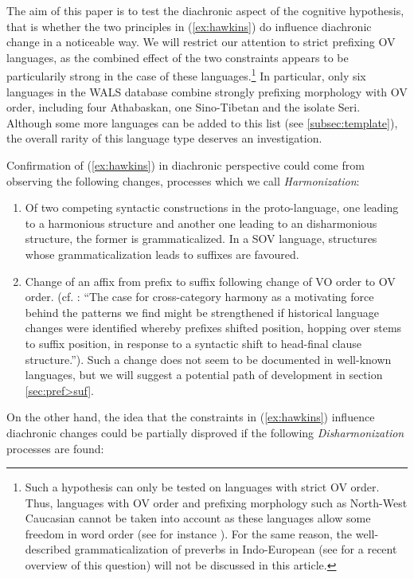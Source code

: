 \documentclass[oldfontcommands,twoside,a4paper,12pt]{article}
\begin{document}
 
 The aim of this paper is to test the diachronic aspect of the cognitive hypothesis, that is whether the two principles in (\ref{ex:hawkins}) do influence diachronic change in a noticeable way. We will restrict our attention to strict prefixing OV languages, as the combined effect of the two constraints appears to be particularily strong in the case of these languages.\footnote{Such a hypothesis can only be tested on languages with strict OV order. Thus, languages with OV order and prefixing morphology such as North-West Caucasian cannot be taken into account as these languages allow some freedom in word order (see for instance \citealt[301]{korotkova10polysynthesis}). For the same reason, the well-described grammaticalization of preverbs in Indo-European (see   \citet{hewson06adposition} for a recent overview of this question) will not be discussed in this article.}  In particular, only six languages in the WALS database combine strongly prefixing morphology with OV order, including four Athabaskan, one Sino-Tibetan and the isolate Seri. Although some more languages can be added to this list (see \ref{subsec:template}), the overall rarity of this language type deserves an investigation. 
 
 
 
Confirmation of (\ref{ex:hawkins}) in diachronic perspective could come from observing the following changes, processes which we call \textit{Harmonization}:
\begin{enumerate}
\item Of two competing syntactic constructions in the proto-language, one leading to a harmonious structure and another one leading to an disharmonious structure, the former is grammaticalized. In a SOV language, structures whose grammaticalization leads to suffixes are favoured.
\item Change of an affix from prefix to suffix following change of VO order to OV order. (cf. \citealt[182]{mithun03prefixes}: ``The case for cross-category harmony as a motivating force behind the patterns we find might be strengthened if historical language changes were identified whereby prefixes shifted position, hopping over stems to suffix position, in response to a syntactic shift to head-final clause structure.''). Such a change does not seem to be documented in well-known languages, but we will suggest a potential path of development in section \ref{sec:pref>suf}.

\end{enumerate}

On the other hand, the idea that the constraints in (\ref{ex:hawkins}) influence diachronic changes could be partially disproved if the following \textit{Disharmonization} processes are found:
\end{document}
